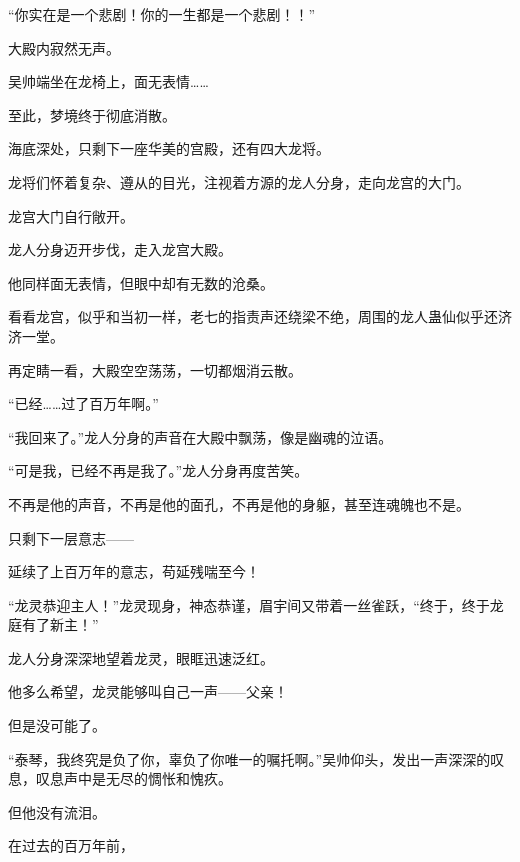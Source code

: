 \begin{this_body}
“你实在是一个悲剧！你的一生都是一个悲剧！！”

大殿内寂然无声。

吴帅端坐在龙椅上，面无表情……

至此，梦境终于彻底消散。

海底深处，只剩下一座华美的宫殿，还有四大龙将。

龙将们怀着复杂、遵从的目光，注视着方源的龙人分身，走向龙宫的大门。

龙宫大门自行敞开。

龙人分身迈开步伐，走入龙宫大殿。

他同样面无表情，但眼中却有无数的沧桑。

看看龙宫，似乎和当初一样，老七的指责声还绕梁不绝，周围的龙人蛊仙似乎还济济一堂。

再定睛一看，大殿空空荡荡，一切都烟消云散。

“已经……过了百万年啊。”

“我回来了。”龙人分身的声音在大殿中飘荡，像是幽魂的泣语。

“可是我，已经不再是我了。”龙人分身再度苦笑。

不再是他的声音，不再是他的面孔，不再是他的身躯，甚至连魂魄也不是。

只剩下一层意志——

延续了上百万年的意志，苟延残喘至今！

“龙灵恭迎主人！”龙灵现身，神态恭谨，眉宇间又带着一丝雀跃，“终于，终于龙庭有了新主！”

龙人分身深深地望着龙灵，眼眶迅速泛红。

他多么希望，龙灵能够叫自己一声——父亲！

但是没可能了。

“泰琴，我终究是负了你，辜负了你唯一的嘱托啊。”吴帅仰头，发出一声深深的叹息，叹息声中是无尽的惆怅和愧疚。

但他没有流泪。

在过去的百万年前，

\end{this_body}

